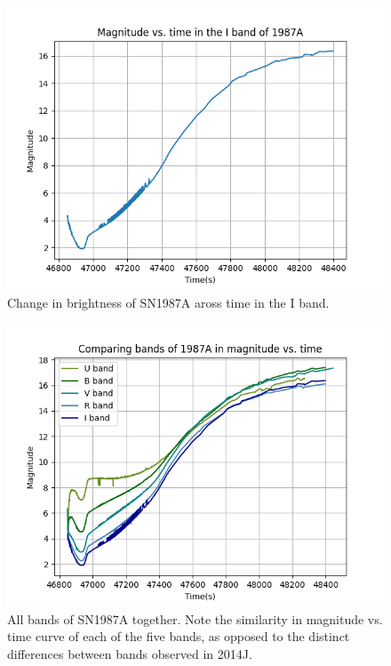 \begin{figure}[h]
	\includegraphics[width=1.0\textwidth]{1987A_I_magvstime.png}
	\caption{Change in brightness of SN1987A aross time in the I band.}
\end{figure}
\begin{figure}[h]
	\includegraphics[width=1.0\textwidth]{1987A_all_magvstime.png}
	\caption{All bands of SN1987A together. Note the similarity in magnitude vs. time curve of each of the five bands, as opposed to the distinct differences between bands observed in 2014J.}
\end{figure}

